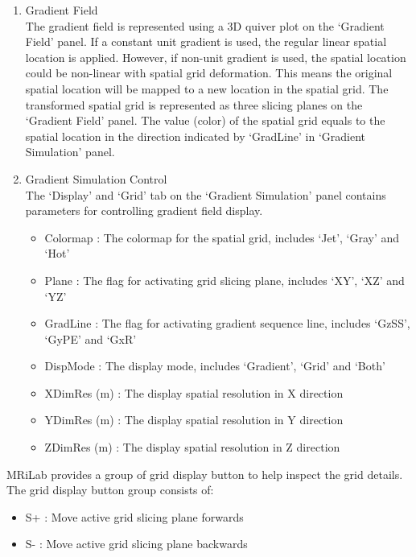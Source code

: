\documentclass{book}%
\begin{document}
\begin{enumerate}
	\item Gradient Field \\
	
The gradient field is represented using a 3D quiver plot on the `Gradient Field' panel. If a constant unit gradient is used, the regular linear spatial location is applied. However, if non-unit gradient is used, the spatial location could be non-linear with spatial grid deformation. This means the original spatial location will be mapped to a new location in the spatial grid. The transformed spatial grid is represented as three slicing planes on the `Gradient Field' panel. The value (color) of the spatial grid equals to the spatial location in the direction indicated by `GradLine' in `Gradient Simulation' panel.
	
	\item Gradient Simulation Control \\
	
The `Display' and `Grid' tab on the `Gradient Simulation' panel contains parameters for controlling gradient field display.

\begin{itemize}
	\item Colormap : The colormap for the spatial grid, includes `Jet', `Gray' and `Hot'
	\item Plane : The flag for activating grid slicing plane, includes `XY', `XZ' and `YZ'
	\item GradLine : The flag for activating gradient sequence line, includes `GzSS', `GyPE' and `GxR'
	\item DispMode : The display mode, includes `Gradient', `Grid' and `Both'
	\item XDimRes (m) : The display spatial resolution in X direction
	\item YDimRes (m) : The display spatial resolution in Y direction
	\item ZDimRes (m) : The display spatial resolution in Z direction
\end{itemize}

\end{enumerate}

MRiLab provides a group of grid display button to help inspect the grid details. The grid display button group consists of:

\begin{itemize}
	\item S+ : Move active grid slicing plane forwards
	\item S- : Move active grid slicing plane backwards
\end{itemize}
\end{document}
